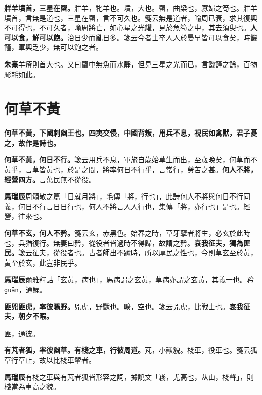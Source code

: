 \textbf{牂羊墳首，三星在罶。}{\footnotesize 牂羊，牝羊也。墳，大也。罶，曲梁也，寡婦之笱也。牂羊墳首，言無是道也，三星在罶，言不可久也。箋云無是道者，喻周已衰，求其復興不可得也，不可久者，喻周將亡，如心星之光耀，見於魚笱之中，其去須臾也。}\textbf{人可以食，鮮可以飽。}{\footnotesize 治日少而亂日多。箋云今者士卒人人於晏早皆可以食矣，時饑饉，軍興乏少，無可以飽之者。}

\begin{quoting}\textbf{朱熹}羊瘠則首大也。又曰罶中無魚而水靜，但見三星之光而已，言饑饉之餘，百物彫耗如此。\end{quoting}

\section{何草不黃}


\textbf{何草不黃，下國刺幽王也。四夷交侵，中國背叛，用兵不息，視民如禽獸，君子憂之，故作是詩也。}

\textbf{何草不黃，何日不行。}{\footnotesize 箋云用兵不息，軍旅自歲始草生而出，至歲晚矣，何草而不黃乎，言草皆黃也，於是之間，將率何日不行乎，言常行，勞苦之甚。}\textbf{何人不將，經營四方。}{\footnotesize 言萬民無不從役。}

\begin{quoting}\textbf{馬瑞辰}周頌敬之篇「日就月將」，毛傳「將，行也」，此詩何人不將與何日不行同義，何日不行言日日行也，何人不將言人人行也，集傳「將，亦行也」是也。經營，往來也。\end{quoting}

\textbf{何草不玄，何人不矜。}{\footnotesize 箋云玄，赤黑色。始春之時，草牙孽者將生，必玄於此時也，兵猶復行。無妻曰矜，從役者皆過時不得歸，故謂之矜。}\textbf{哀我征夫，獨為匪民。}{\footnotesize 箋云征夫，從役者也。古者師出不踰時，所以厚民之性也，今則草玄至於黃，黃至於玄，此豈非民乎。}

\begin{quoting}\textbf{馬瑞辰}爾雅釋詁「玄黃，病也」，馬病謂之玄黃，草病亦謂之玄黃，其義一也。矜 \texttt{guān}，通鰥。\end{quoting}

\textbf{匪兕匪虎，率彼曠野。}{\footnotesize 兕虎，野獸也。曠，空也。箋云兕虎，比戰士也。}\textbf{哀我征夫，朝夕不暇。}

\begin{quoting}匪，通彼。\end{quoting}

\textbf{有芃者狐，率彼幽草。有棧之車，行彼周道。}{\footnotesize 芃，小獸貌。棧車，役車也。箋云狐草行草止，故以比棧車輦者。}

\begin{quoting}\textbf{馬瑞辰}有棧之車與有芃者狐皆形容之詞，據說文「嶘，尤高也，从山，棧聲」，則棧當為車高之貌。\end{quoting}

